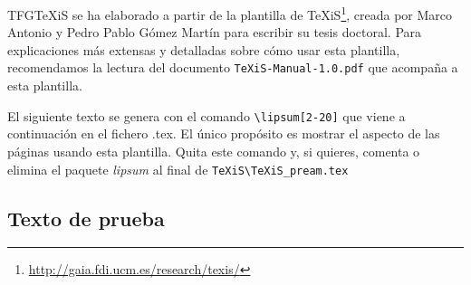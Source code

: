 TFGTeXiS se ha elaborado a partir de la plantilla de TeXiS\footnote{\url{http://gaia.fdi.ucm.es/research/texis/}}, creada por Marco Antonio y Pedro Pablo Gómez Martín para escribir su tesis doctoral. Para explicaciones más extensas y detalladas sobre cómo usar esta plantilla, recomendamos la lectura del documento \texttt{TeXiS-Manual-1.0.pdf} que acompaña a esta plantilla.

El siguiente texto se genera con el comando \verb|\lipsum[2-20]| que viene a continuación en el fichero .tex. El único propósito es mostrar el aspecto de las páginas usando esta plantilla. Quita este comando y, si quieres, comenta o elimina el paquete \textit{lipsum} al final de \verb|TeXiS\TeXiS_pream.tex|

\subsection{Texto de prueba}


\lipsum[2-20]